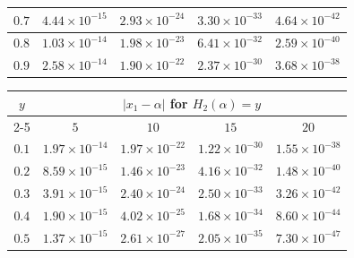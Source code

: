 \documentclass{article}
\begin{document}
\begin{table}[t]
\begin{tabular}{|c|cccc|}
$0.7$                & \multicolumn{1}{c|}{$4.44\times 10^{-15}$} & \multicolumn{1}{c|}{$2.93\times 10^{-24}$} & \multicolumn{1}{c|}{$3.30\times 10^{-33}$} & $4.64\times 10^{-42}$ \\ \hline
$0.8$                & \multicolumn{1}{c|}{$1.03\times 10^{-14}$} & \multicolumn{1}{c|}{$1.98\times 10^{-23}$} & \multicolumn{1}{c|}{$6.41\times 10^{-32}$} & $2.59\times 10^{-40}$ \\ \hline
$0.9$                & \multicolumn{1}{c|}{$2.58\times 10^{-14}$} & \multicolumn{1}{c|}{$1.90\times 10^{-22}$} & \multicolumn{1}{c|}{$2.37\times 10^{-30}$} & $3.68\times 10^{-38}$ \\ \hline
\end{tabular}
\medskip

\begin{tabular}{|c|cccc|}
\hline
\multirow{2}{*}{$y$} & \multicolumn{4}{c|}{ $|x_{1}-\alpha|$ for $H_{2}(\alpha)=y$}                                                                                                                                                           \\ \cline{2-5} 
                     & \multicolumn{1}{c|}{$5$}                                                      & \multicolumn{1}{c|}{$10$}                  & \multicolumn{1}{c|}{$15$}                  & $20$                  \\ \hline
$0.1$                & \multicolumn{1}{c|}{$1.97\times 10^{-14}$}                                    & \multicolumn{1}{c|}{$1.97\times 10^{-22}$} & \multicolumn{1}{c|}{$1.22\times 10^{-30}$} & $1.55\times 10^{-38}$ \\ \hline
$0.2$                & \multicolumn{1}{c|}{$8.59\times 10^{-15}$}                                    & \multicolumn{1}{c|}{$1.46\times 10^{-23}$} & \multicolumn{1}{c|}{$4.16\times 10^{-32}$} & $1.48\times 10^{-40}$ \\ \hline
$0.3$                & \multicolumn{1}{c|}{$3.91\times 10^{-15}$}                                    & \multicolumn{1}{c|}{$2.40\times 10^{-24}$} & \multicolumn{1}{c|}{$2.50\times 10^{-33}$} & $3.26\times 10^{-42}$ \\ \hline
$0.4$                & \multicolumn{1}{c|}{$1.90\times 10^{-15}$}                                    & \multicolumn{1}{c|}{$4.02\times 10^{-25}$} & \multicolumn{1}{c|}{$1.68\times 10^{-34}$} & $8.60\times 10^{-44}$ \\ \hline
$0.5$                & \multicolumn{1}{c|}{$1.37\times 10^{-15}$}                                    & \multicolumn{1}{c|}{$2.61\times 10^{-27}$} & \multicolumn{1}{c|}{$2.05\times 10^{-35}$} & $7.30\times 10^{-47}$ \\ \hline

\end{tabular}
\end{table}
\end{document}
